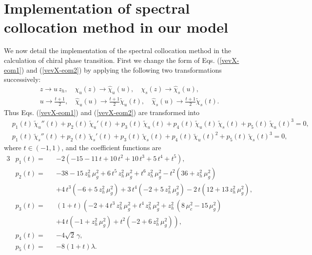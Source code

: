 \documentclass[11pt,a4paper,psfrag]{article}
\begin{document}
\section{Implementation of spectral collocation method in our model}
We now detail the implementation of the spectral collocation method in the calculation of chiral phase transition. First we change the form of Eqs. (\ref{vevX-eom1}) and (\ref{vevX-eom2}) by applying the following two transformations successively:
\begin{align}
& z \to u\,z_h, \quad \chi_u (z) \to \hat{\chi}_u (u), \quad \chi_s (z) \to \hat{\chi}_s (u), \label{transfSeqIndex1} \\
& u \to \frac{t+1}{2}, \quad \hat{\chi}_u(u) \to \frac{t+1}{2}\tilde{\chi}_u(t), \quad \hat{\chi}_s(u) \to \frac{t+1}{2}\tilde{\chi}_s(t). \label{transfSeqIndex2}
\end{align}
Thus Eqs. (\ref{vevX-eom1}) and (\ref{vevX-eom2}) are transformed into
\begin{align}
&p_{1}(t)\,\tilde{\chi}_{u}''(t)+p_{2}(t)\,\tilde{\chi}_{u}'(t)+p_{3}(t)\,
\tilde{\chi}_{u}(t)+p_{4}(t)\,\tilde{\chi}_{u}(t)\,\tilde{\chi}_{s}(t)+p_{5}(t)\,
\tilde{\chi}_{u}(t)^{3}=0, \label{vevX-eom3-1} \\
&p_{1}(t)\,\tilde{\chi}_{s}''(t)+p_{2}(t)\,\tilde{\chi}_{s}'(t)+p_{3}(t)\,
\tilde{\chi}_{s}(t)+p_{4}(t)\,\tilde{\chi}_{u}(t)^{2}+p_{5}(t)\,
\tilde{\chi}_{s}(t)^{3}=0, \label{vevX-eom3-2}
\end{align}
where $t \in \left(-1,1\right)$, and the coefficient functions are
\begin{alignat}{3}
\label{coe-vevX-eom3}
&p_{1}(t)=&&-2 \left(-15 - 11\, t + 10\, t^2 + 10\, t^3 + 5\, t^4 + t^5\right), \nonumber&\\
&p_{2}(t)=&&-38 -15\, z_h^2\, \mu_g^2 + 6\, t^5\, z_h^2 \,\mu_g^2 + t^6 \,z_h^2 \,\mu_g^2  -t^2 \left(36 + z_h^2\, \mu_g^2\right)  \nonumber&\\
&&&+ 4\, t^3 \left(-6 + 5 \,z_h^2\,\mu_g^2\right)+3\, t^4 \left(-2 + 5\, z_h^2 \,\mu_g^2\right) - 2\, t \left(12 + 13 \,z_h^2 \,\mu_g^2\right), \nonumber&\\
&p_{3}(t)=&&\left(1 + t\right) \left(-2 + 4\, t^3 \,z_h^2\, \mu_g^2 + t^4 \,z_h^2 \,\mu_g^2 +z_h^2 \,\left(8 \,\mu_c^2 - 15 \,\mu_g^2 \right)\right. &\\
&&&\left.+4\, t \left(-1+ z_h^2 \,\mu_g^2\right) + t^2 \left(-2 + 6 \,z_h^2 \,\mu_g^2\right)\right), \nonumber&\\
&p_{4}(t)=&&-4 \sqrt{2}\, \gamma, \nonumber&\\
&p_{5}(t)=&&-8\left(1 + t\right)\lambda. \nonumber&
\end{alignat}
\end{document}

